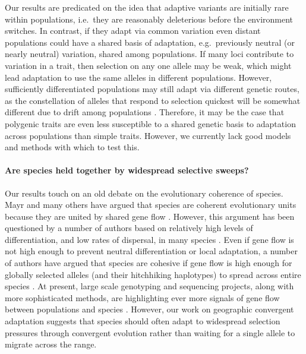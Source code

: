 \documentclass{article}
\begin{document}
Our results are predicated on the idea that adaptive variants are
initially rare within populations, i.e.\ they are reasonably
deleterious before the environment switches. In contrast, if they adapt via common variation even distant populations could have
a shared basis of adaptation, e.g.\ previously neutral (or nearly neutral) variation, shared among populations. 
If many loci contribute to variation in a trait, then
selection on any one allele may be weak, 
which might lead adaptation to use the same alleles in different populations.
However, sufficiently differentiated populations may still
adapt via different genetic routes, as the constellation of alleles
that respond to selection quickest will be somewhat different due to
drift among populations \citep{Barton:89}.
Therefore, it may be the case that polygenic traits are even less susceptible to a shared
genetic basis to adaptation across populations than simple traits.   
However, we currently lack good models and methods with which to test this.


\paragraph{Are species held together by widespread selective sweeps?}
Our results touch on an old debate on the evolutionary coherence of species. 
Mayr and many others have argued that species are coherent
evolutionary units because they are united by shared gene flow \citep[pages 521--522 in][]{Mayr:SpeciesEvol}. 
However, this argument has been questioned by a number of authors 
based on relatively high levels of differentiation, and low rates of dispersal, in many species \citep{EhrlichRaven:69,Levin:79}.
Even if gene flow is not high enough to prevent neutral differentiation or local adaptation, 
a number of authors have argued that species are cohesive 
if gene flow is high enough for globally selected alleles 
(and their hitchhiking haplotypes)
to spread across entire species 
\citep[see also][]{Rieseberg2001,MorjanRieseberg:04,Ellstrand2014}.
At present, large scale genotyping and sequencing projects, 
along with more sophisticated methods, 
are highlighting ever more signals of gene flow between populations and species \citep{Patterson:12,SousaHey:13,Hellenthal:14}.
However, our work on geographic convergent adaptation
\citep[see also][]{ralphcoop2010,RalphCoop:14} 
suggests that species should often adapt to
widespread selection pressures through convergent evolution rather
than waiting for a single allele to migrate across the range. 
\end{document}
